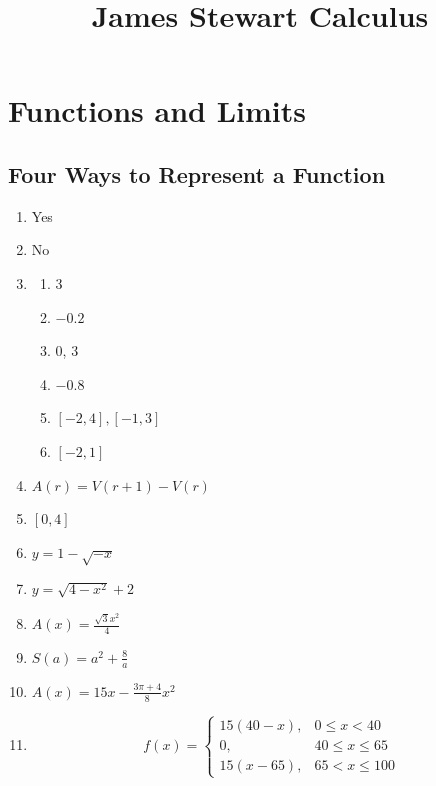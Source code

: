\documentclass{article}
\title{James Stewart Calculus}
\author{}
\date{}
\begin{document}
\maketitle
\section{Functions and Limits}
\subsection{Four Ways to Represent a Function}
\begin{enumerate}
  \item Yes
  \item No
  \item \begin{enumerate}[label=(\alph*)]
          \item 3
          \item $-0.2$
          \item 0, 3
          \item $-0.8$
          \item $[-2, 4], [-1, 3]$
          \item $[-2, 1]$
        \end{enumerate}
        \setcounter{enumi}{25}
  \item $A(r) = V(r+1) - V(r)$
        \setcounter{enumi}{36}
  \item $[0, 4]$
        \setcounter{enumi}{52}
  \item $y = 1-\sqrt{-x}$
  \item $y = \sqrt{4-x^2}+2$
        \setcounter{enumi}{58}
  \item $A(x) = \frac{\sqrt{3}x^2}{4}$
        \setcounter{enumi}{60}
  \item $S(a) = a^2 + \frac{8}{a}$
  \item $A(x) = 15x - \frac{3\pi+4}{8}x^2$
        \setcounter{enumi}{64}
  \item \[
          f(x) =
          \begin{cases}
            15(40-x), & 0 \le x < 40    \\
            0,        & 40 \le x \le 65 \\
            15(x-65), & 65 < x \le 100
          \end{cases}
        \]
\end{enumerate}
\end{document}
